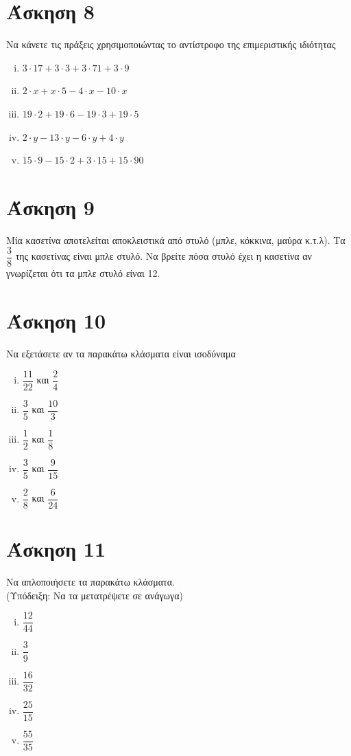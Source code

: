 \documentclass[a4paper,10pt]{report}
\begin{document}
\section*{Άσκηση 8  \hfill \small{}}
Να κάνετε τις πράξεις χρησιμοποιώντας το αντίστροφο της επιμεριστικής ιδιότητας
\begin{enumerate}[i)]
 \item $3\cdot 17 +3\cdot 3 +3\cdot 71+3\cdot 9$
 \item $2\cdot x+x\cdot 5-4\cdot x -10\cdot x$
 \item $19\cdot 2+19\cdot 6-19\cdot 3+19\cdot 5$
 \item $2\cdot y-13\cdot y -6\cdot y+4\cdot y$
 \item $15\cdot 9-15\cdot 2+3\cdot 15+15\cdot 90$
\end{enumerate}


\section*{Άσκηση 9  \hfill \small{}}
Μία κασετίνα αποτελείται αποκλειστικά από στυλό (μπλε, κόκκινα, μαύρα κ.τ.λ). Τα $\dfrac{3}{8}$ της κασετίνας 
είναι μπλε στυλό. Να βρείτε πόσα στυλό έχει η κασετίνα αν γνωρίζεται ότι τα μπλε στυλό είναι 12.

\section*{Άσκηση 10  \hfill \small{}}
Να εξετάσετε αν τα παρακάτω κλάσματα είναι ισοδύναμα 
\begin{enumerate}[i)]
 \item $\dfrac{11}{22}$ και $\dfrac{2}{4}$
 \item $\dfrac{3}{5}$ και $\dfrac{10}{3}$
 \item $\dfrac{1}{2}$ και $\dfrac{1}{8}$
 \item $\dfrac{3}{5}$ και $\dfrac{9}{15}$
 \item $\dfrac{2}{8}$ και $\dfrac{6}{24}$
\end{enumerate}

\section*{Άσκηση 11  \hfill \small{}}
Να απλοποιήσετε τα παρακάτω κλάσματα. \\
(Υπόδειξη: Να τα μετατρέψετε σε ανάγωγα)
\begin{enumerate}[i)]
 \item $\dfrac{12}{44}$
 \item $\dfrac{3}{9}$
 \item $\dfrac{16}{32}$
 \item $\dfrac{25}{15}$
 \item $\dfrac{55}{35}$
\end{enumerate}
\end{document}
